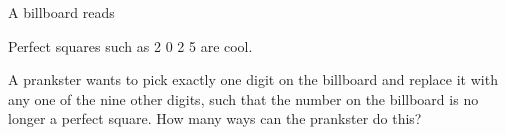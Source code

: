 A billboard reads



Perfect squares such as 2 0 2 5 are cool. 



A prankster wants to pick exactly one digit on the billboard and replace it with any one of the nine other digits, such that the number on the billboard is no longer a perfect square. How many ways can the prankster do this?
